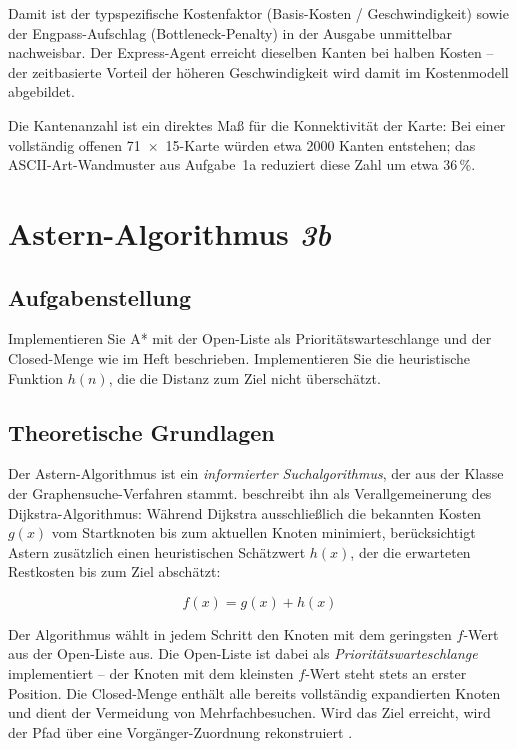 Damit ist der typspezifische Kostenfaktor (Basis-Kosten / Geschwindigkeit) sowie der Engpass-Aufschlag (Bottleneck-Penalty) in der Ausgabe unmittelbar nachweisbar. Der Express-Agent erreicht dieselben Kanten bei halben Kosten -- der zeitbasierte Vorteil der höheren Geschwindigkeit wird damit im Kostenmodell abgebildet.

Die Kantenanzahl ist ein direktes Maß für die Konnektivität der Karte: Bei einer vollständig offenen 71~\(\times\)~15-Karte würden etwa 2000 Kanten entstehen; das \acs{ASCII}-Art-Wandmuster aus Aufgabe~1a reduziert diese Zahl um etwa 36\,\%.


\section{\acs{Astern}-Algorithmus \textit{3b}}
\label{sec:aufgabe3b}

\subsection{Aufgabenstellung}

Implementieren Sie A* mit der Open-Liste als Prioritätswarteschlange und der Closed-Menge wie im Heft beschrieben. Implementieren Sie die heuristische Funktion \(h(n)\), die die Distanz zum Ziel nicht überschätzt.

\subsection{Theoretische Grundlagen}

Der \acs{Astern}-Algorithmus ist ein \textit{informierter Suchalgorithmus}, der aus der Klasse der Graphensuche-Verfahren stammt. \textcite[S. 21\,f.]{5} beschreibt ihn als Verallgemeinerung des Dijkstra-Algorithmus: Während Dijkstra ausschließlich die bekannten Kosten \(g(x)\) vom Startknoten bis zum aktuellen Knoten minimiert, berücksichtigt \acs{Astern} zusätzlich einen heuristischen Schätzwert \(h(x)\), der die erwarteten Restkosten bis zum Ziel abschätzt:

\[
f(x) = g(x) + h(x)
\]

Der Algorithmus wählt in jedem Schritt den Knoten mit dem geringsten \(f\)-Wert aus der Open-Liste aus. Die Open-Liste ist dabei als \textit{Prioritätswarteschlange} implementiert -- der Knoten mit dem kleinsten \(f\)-Wert steht stets an erster Position. Die Closed-Menge enthält alle bereits vollständig expandierten Knoten und dient der Vermeidung von Mehrfachbesuchen. Wird das Ziel erreicht, wird der Pfad über eine Vorgänger-Zuordnung rekonstruiert \cite[S. 21\,ff.]{5}.

